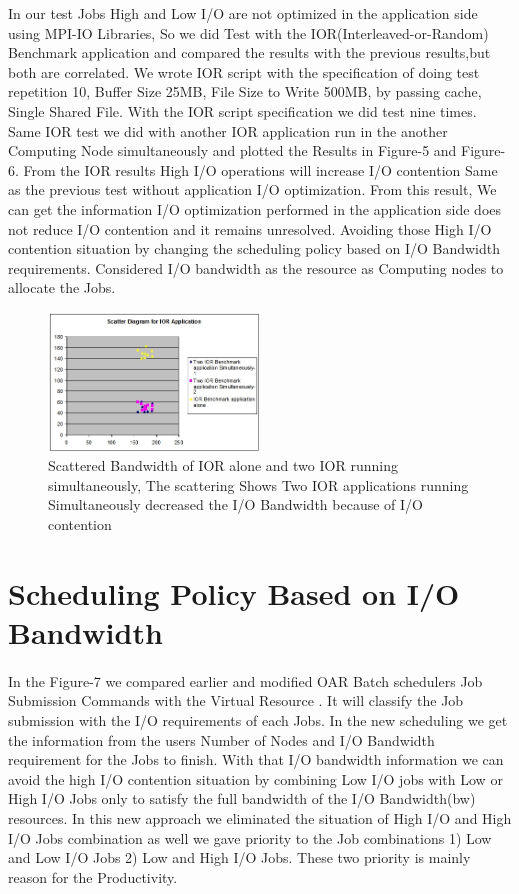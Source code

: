 \documentclass{article}
\begin{document}
In our test Jobs High and Low I/O are not optimized in the application side using MPI-IO Libraries, So we did Test with the IOR(Interleaved-or-Random) Benchmark application and compared the results with the previous results,but both are correlated. We wrote IOR script with the specification of doing test repetition 10, Buffer Size 25MB, File Size to Write 500MB, by passing cache, Single Shared File. With the IOR script specification we did test nine times. Same IOR test we did with another IOR application run in the another Computing Node simultaneously and plotted the Results in Figure-5 and Figure-6. From the IOR results High I/O operations will increase I/O contention Same as the previous test without application I/O optimization. From this result, We can get the information I/O optimization performed in the application side does not reduce I/O contention and it remains unresolved. Avoiding those High I/O contention situation by changing the scheduling policy based on I/O Bandwidth requirements. Considered I/O bandwidth as the resource as Computing nodes to allocate the Jobs.
\newline
\begin{figure}
  \centering    
      \includegraphics[width=0.5\textwidth]{IOR-Scatter.jpg}
  \caption{Scattered Bandwidth of IOR alone and two IOR running simultaneously, The scattering Shows Two IOR applications running Simultaneously decreased the I/O Bandwidth because of I/O contention}
\end{figure}

\section{Scheduling Policy Based on I/O Bandwidth}
\paragraph{}In the Figure-7 we compared earlier and modified OAR Batch schedulers Job Submission Commands with the Virtual Resource . It will classify the Job submission with the I/O requirements of each Jobs. In the new scheduling we get the information from the users Number of Nodes and I/O Bandwidth requirement for the Jobs to finish. With that I/O bandwidth information we can avoid the high I/O contention situation by combining Low I/O jobs with Low or High I/O Jobs only to satisfy the full bandwidth of the I/O Bandwidth(bw) resources. In this new approach we eliminated the situation of High I/O and High I/O Jobs combination as well we gave priority to the Job combinations 1) Low and Low I/O Jobs 2) Low and High I/O Jobs. These two priority is mainly reason for the Productivity.
\end{document}
